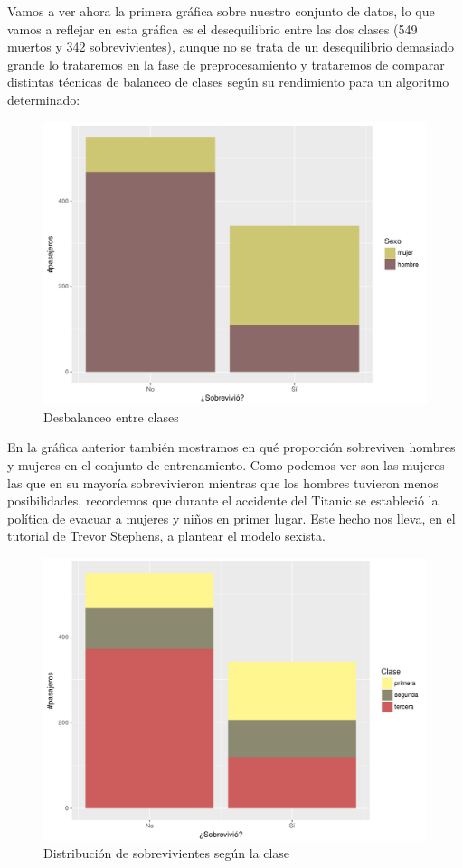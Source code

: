 \documentclass[10pt,a4paper]{article}
\begin{document}
Vamos a ver ahora la primera gráfica sobre nuestro conjunto de datos, lo que vamos a reflejar en esta gráfica es el desequilibrio entre las dos clases (549 muertos y 342 sobrevivientes), aunque no se trata de un desequilibrio demasiado grande lo trataremos en la fase de preprocesamiento y trataremos de comparar distintas técnicas de balanceo de clases según su rendimiento para un algoritmo determinado:

\begin{figure}[H]
  \centering
  \includegraphics[width=\textwidth]{imgs/imbalanced.pdf}
  \caption{Desbalanceo entre clases}
\end{figure}

En la gráfica anterior también mostramos en qué proporción sobreviven hombres y mujeres en el conjunto de entrenamiento. Como podemos ver son las mujeres las que en su mayoría sobrevivieron mientras que los hombres tuvieron menos posibilidades, recordemos que durante el accidente del Titanic se estableció la política de evacuar a mujeres y niños en primer lugar. Este hecho nos lleva, en el tutorial de Trevor Stephens, a plantear el modelo sexista.

\begin{figure}[H]
  \centering
  \includegraphics[width=\textwidth]{imgs/classes.pdf}
  \caption{Distribución de sobrevivientes según la clase}
\end{figure}
\end{document}
